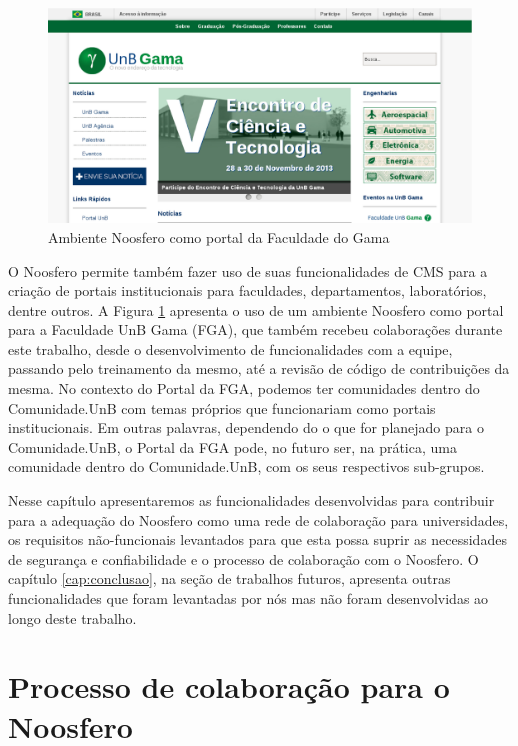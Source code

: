 \begin{figure}[h]
    \centering
    \includegraphics[keepaspectratio=true,scale=0.4]
      {figuras/portal-fga.eps}
    \caption{Ambiente Noosfero como portal da Faculdade do Gama}
    \label{portal-fga}
\end{figure}

O Noosfero permite também fazer uso de suas funcionalidades de CMS para a
criação de portais institucionais para faculdades, departamentos, laboratórios,
dentre outros. A Figura \ref{portal-fga} apresenta o uso de um ambiente
Noosfero como portal para a Faculdade UnB Gama (FGA), que também recebeu
colaborações durante este trabalho, desde o desenvolvimento de funcionalidades com a equipe,
passando pelo treinamento da mesmo, até a revisão de código de contribuições da mesma.
%
No contexto do Portal da FGA, podemos ter comunidades dentro do
Comunidade.UnB com temas próprios que funcionariam como portais institucionais.
%
Em outras palavras, dependendo do o que for planejado para o Comunidade.UnB, o
Portal da FGA pode, no futuro ser, na prática, uma comunidade dentro do Comunidade.UnB,
com os seus respectivos sub-grupos.

Nesse capítulo apresentaremos as funcionalidades desenvolvidas para contribuir
para a adequação do Noosfero como uma rede de colaboração para universidades,
os requisitos não-funcionais levantados para que esta possa suprir as
necessidades de segurança e confiabilidade e o processo de colaboração com o
Noosfero. O capítulo \ref{cap:conclusao}, na seção de trabalhos futuros, apresenta outras funcionalidades que
foram levantadas por nós mas não foram desenvolvidas ao longo deste trabalho.

\section{Processo de colaboração para o Noosfero}

